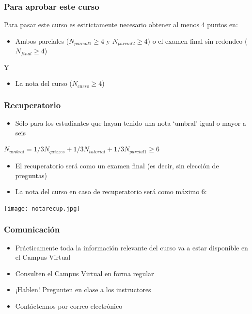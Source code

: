 \documentclass[14pt]{beamer}
\begin{document}
\begin{frame}
\frametitle{Para aprobar este curso}
Para pasar este curso es estrictamente necesario obtener al menos 4 puntos en:
\vspace{2mm}
\begin{itemize}
    \item Ambos parciales ($N_{parcial 1} \geq 4$ y $N_{parcial 2} \geq 4$) o el examen final sin redondeo ($N_{final} \geq 4$)
\end{itemize}
\centering Y
\vspace{2mm}
\begin{itemize}
    \item La nota del curso ($N_{curso} \geq 4$)
\end{itemize}
\end{frame}

\begin{frame}
\frametitle{Recuperatorio}
\begin{itemize}
    \item Sólo para los estudiantes que hayan tenido una nota ‘umbral’ igual o mayor a seis
\end{itemize}
    $N_{umbral}=1/3N_{quizzes}+1/3N_{tutorial}+1/3N_{parcial 1} \geq 6$
\begin{itemize}
    \item El recuperatorio será como un examen final (es decir, sin elección de preguntas)
    \item La nota del curso en caso de recuperatorio será como máximo 6:
\end{itemize}
\centering
\texttt{[image: notarecup.jpg]}
\end{frame}


\begin{frame}
\frametitle{Comunicación}
\begin{itemize}
    \item Prácticamente toda la información relevante del curso va a estar disponible en el Campus Virtual
    \item Consulten el Campus Virtual en forma regular
    \item ¡Hablen! Pregunten en clase a los instructores
    \item Contáctennos por correo electrónico 
\end{itemize}
\end{frame}
\end{document}
